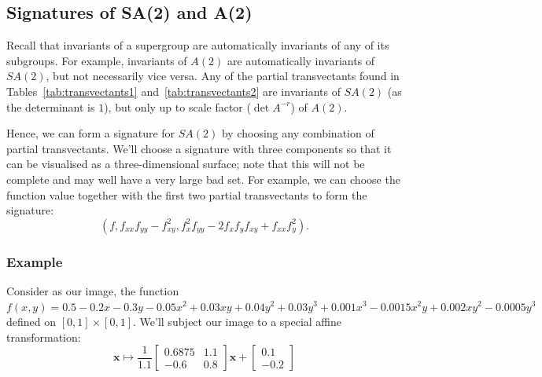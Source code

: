 \documentclass[review,onefignum,onetabnum]{siamonline190516}
\begin{document}
{

\subsection{Signatures of SA(2) and A(2)}
Recall that invariants of a supergroup are automatically invariants of any of
its subgroups. For example, invariants of $A(2)$ are automatically invariants of $SA(2)$, but not necessarily vice versa. Any of the partial transvectants found in Tables~\ref{tab:transvectants1} and~\ref{tab:transvectants2} are invariants of $SA(2)$ (as the determinant is $1$), but only up to scale factor ($\det A^{-r}$) of $A(2)$.

Hence, we can form a signature for $SA(2)$ by choosing any combination of
partial transvectants. We'll choose a signature with three components so that
it can be visualised as a three-dimensional surface; note that this will not
be complete and may well have a very large bad set. For example, we can choose the function value together with the first two partial transvectants to form the signature:
\begin{equation*}
    \left(f, f_{xx}f_{yy}-f_{xy}^2, f_x^2f_{yy} - 2f_xf_yf_{xy} + f_{xx}f_y^2\right).
\end{equation*}

\subsubsection{Example}
Consider as our image, the function $f(x, y) = 0.5 - 0.2x - 0.3y - 0.05x^2 +
0.03xy + 0.04y^2 + 0.03y^3 +0.001x^3 - 0.0015x^2y + 0.002xy^2 - 0.0005y^3$
defined on $[0, 1]\times[0, 1]$.
We'll subject our image to a special affine transformation:
\begin{equation*}
\mathbf{x} \mapsto \frac{1}{1.1}\begin{bmatrix} 0.6875 & 1.1 \\ -0.6 & 0.8 \end{bmatrix}\mathbf{x} + \begin{bmatrix} 0.1 \\ -0.2 \end{bmatrix}
\end{equation*}

}
\end{document}
